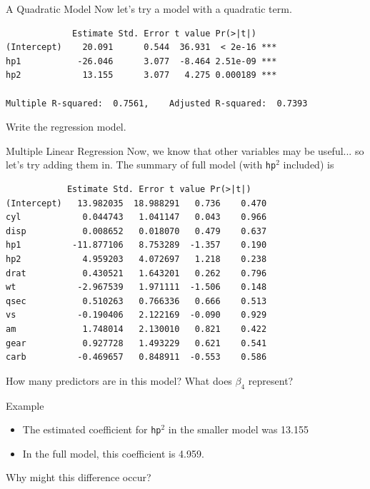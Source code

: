 \begin{frame}[fragile]{A Quadratic Model}
    Now let's try a model with a quadratic term.
    \begin{verbatim}
             Estimate Std. Error t value Pr(>|t|)    
(Intercept)    20.091      0.544  36.931  < 2e-16 ***
hp1           -26.046      3.077  -8.464 2.51e-09 ***
hp2            13.155      3.077   4.275 0.000189 ***

Multiple R-squared:  0.7561,	Adjusted R-squared:  0.7393 
    \end{verbatim}
    Write the regression model.
\end{frame}

\begin{frame}[fragile]{Multiple Linear Regression}
    Now, we know that other variables may be useful... so let's try adding them in. The summary of full model (with \texttt{hp}$^2$ included) is
    \small{\begin{verbatim}
            Estimate Std. Error t value Pr(>|t|)  
(Intercept)   13.982035  18.988291   0.736    0.470
cyl            0.044743   1.041147   0.043    0.966
disp           0.008652   0.018070   0.479    0.637
hp1          -11.877106   8.753289  -1.357    0.190
hp2            4.959203   4.072697   1.218    0.238
drat           0.430521   1.643201   0.262    0.796
wt            -2.967539   1.971111  -1.506    0.148
qsec           0.510263   0.766336   0.666    0.513
vs            -0.190406   2.122169  -0.090    0.929
am             1.748014   2.130010   0.821    0.422
gear           0.927728   1.493229   0.621    0.541
carb          -0.469657   0.848911  -0.553    0.586 
    \end{verbatim}}
    \vspace{-10pt}How many predictors are in this model? What does $\beta_4$ represent?
\end{frame}

\begin{frame}{Example}
    \begin{itemize}
        \item The estimated coefficient for \texttt{hp}$^2$ in the smaller model was 13.155
        \item In the full model, this coefficient is 4.959.
    \end{itemize}
    Why might this difference occur?
\end{frame}

